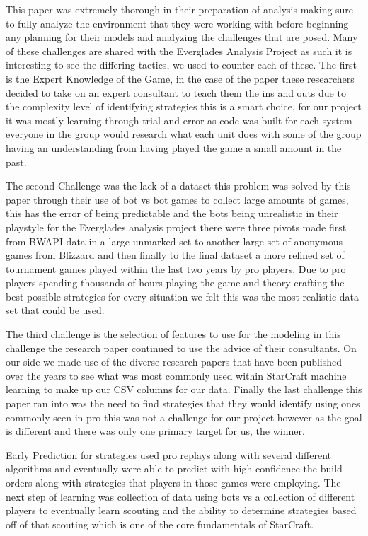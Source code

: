 \documentclass[a4paper,12pt]{report}
\begin{document}
This paper was extremely thorough in their preparation of analysis making sure to fully analyze the environment that they were working with before beginning any planning for their models and analyzing the challenges that are posed. Many of these challenges are shared with the Everglades Analysis Project as such it is interesting to see the differing tactics, we used to counter each of these. The first is the Expert Knowledge of the Game, in the case of the paper these researchers decided to take on an expert consultant to teach them the ins and outs due to the complexity level of identifying strategies this is a smart choice, for our project it was mostly learning through trial and error as code was built for each system everyone in the group would research what each unit does with some of the group having an understanding from having played the game a small amount in the past.

The second Challenge was the lack of a dataset this problem was solved by this paper through their use of bot vs bot games to collect large amounts of games, this has the error of being predictable and the bots being unrealistic in their playstyle for the Everglades analysis project there were three pivots made first from BWAPI data in a large unmarked set to another large set of anonymous games from Blizzard and then finally to the final dataset a more refined set of tournament games played within the last two years by pro players. Due to pro  players spending thousands of hours playing the game and theory crafting the best possible strategies for every situation we felt this was the most realistic data set that could be used.

The third challenge is the selection of features to use for the modeling in this challenge the research paper continued to use the advice of their consultants. On our side we made use of the diverse research papers that have been published over the years to see what was most commonly used within StarCraft machine learning to make up our CSV columns for our data. Finally the last challenge this paper ran into was the need to find strategies that they would identify using ones commonly seen in pro this was not a challenge for our project however as the goal is different and there was only one primary target for us, the winner.

Early Prediction for strategies used pro replays along with several different algorithms and eventually were able to predict with high confidence the build orders along with strategies that players in those games were employing. The next step of learning was collection of data using bots vs a collection of different players to eventually learn scouting and the ability to determine strategies based off of that scouting which is one of the core fundamentals of StarCraft.
\end{document}
